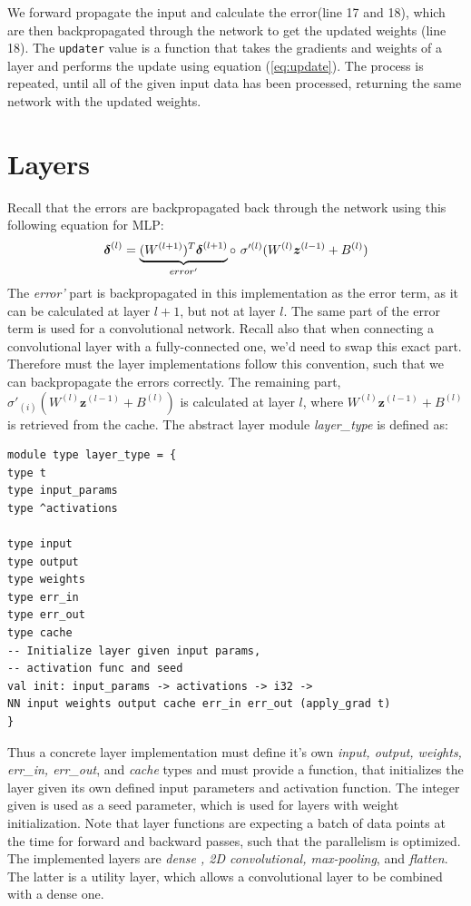 We forward propagate the input and calculate the error(line 17 and 18), which
are then backpropagated through the network to get the updated weights (line
18). 
The \texttt{updater} value is a function that takes the gradients and weights of
a layer and performs the update using equation (\ref{eq:update}). 
The process is repeated, until all of the given input data has been processed,
returning the same network with the updated weights. 

\section{Layers}
Recall that the errors are backpropagated back through the network using this
following equation for MLP:
\begin{equation}
\boldsymbol{\delta}^{(l)} = \underbrace{(W^{(l+1)})^T
	\boldsymbol{\delta}^{(l+1)}}_{error'}  \circ \ \sigma'^{(l)}(W^{(l)}
\boldsymbol{z}^{(l-1)} + B^{(l)})\\
\end{equation}
The \emph{error'} part is backpropagated in this implementation as the error
term, as it can be calculated at layer $l+1$, but not at layer $l$. 
The same part of the error term is used for a convolutional network. 
Recall also that when connecting a convolutional layer with a fully-connected
one, we'd need to swap this exact part. 
Therefore must the layer implementations follow this convention, such that we
can backpropagate the errors correctly. 
The remaining part, $\sigma'_{(i)}(W^{(l)} \boldsymbol{z}^{(l-1)} + B^{(l)})$ is
calculated at layer $l$, where $W^{(l)} \boldsymbol{z}^{(l-1)} + B^{(l)}$ is
retrieved from the cache. 
The abstract layer module \emph{layer\_type} is defined as:
\begin{lstlisting}[language=futhark, caption = {Abstract layer module}]
module type layer_type = {
type t
type input_params
type ^activations

type input
type output
type weights
type err_in
type err_out
type cache
-- Initialize layer given input params, 
-- activation func and seed
val init: input_params -> activations -> i32 -> 
NN input weights output cache err_in err_out (apply_grad t)
}
\end{lstlisting}
Thus a concrete layer implementation must define it's own \emph{input, output,
	weights, err\_in, err\_out}, and \emph{cache} types and must provide a function,
that initializes the layer given its own defined input parameters and 
activation function. 
The integer given is used as a seed parameter, which is used for layers with
weight initialization. 
Note that layer functions are expecting a batch of data points at the time for
forward and backward passes, such that the parallelism is optimized. \newline
\newline 
The implemented layers are \emph{dense , 2D
	convolutional, max-pooling}, and \emph{flatten}. 
The latter is a utility layer, which allows a convolutional layer to be combined
with a dense one. 
